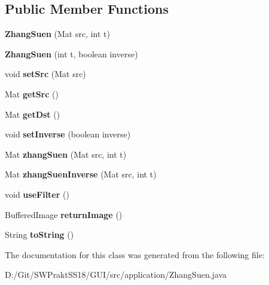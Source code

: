 \subsection*{Public Member Functions}
\begin{DoxyCompactItemize}
\item 
\mbox{\label{classapplication_1_1_zhang_suen_a823dab160c1cbd6fd75439a3651ef2fb}} 
{\bfseries Zhang\+Suen} (Mat src, int t)
\item 
\mbox{\label{classapplication_1_1_zhang_suen_ad13b655dca2f3828609cff40ea77affe}} 
{\bfseries Zhang\+Suen} (int t, boolean inverse)
\item 
\mbox{\label{classapplication_1_1_zhang_suen_a1de41171bc041ea1bc2318f49ba0d116}} 
void {\bfseries set\+Src} (Mat src)
\item 
\mbox{\label{classapplication_1_1_zhang_suen_acfc561cfe4e19101ef72c3b0b3846be6}} 
Mat {\bfseries get\+Src} ()
\item 
\mbox{\label{classapplication_1_1_zhang_suen_a155b9fe37b5cf36fd3857b673b52bd72}} 
Mat {\bfseries get\+Dst} ()
\item 
\mbox{\label{classapplication_1_1_zhang_suen_a8ac61cb706a24be5f56cbc28f7001188}} 
void {\bfseries set\+Inverse} (boolean inverse)
\item 
\mbox{\label{classapplication_1_1_zhang_suen_a9155d617edb00ba059fbffd3499128fe}} 
Mat {\bfseries zhang\+Suen} (Mat src, int t)
\item 
\mbox{\label{classapplication_1_1_zhang_suen_abf8a732e4672ed4f7bbcba7c179fe4c4}} 
Mat {\bfseries zhang\+Suen\+Inverse} (Mat src, int t)
\item 
\mbox{\label{classapplication_1_1_zhang_suen_aec54852dcb044012ced36d0cf6ff546e}} 
void {\bfseries use\+Filter} ()
\item 
\mbox{\label{classapplication_1_1_zhang_suen_ab0f23640f719c5774d7b8a7cfc095996}} 
Buffered\+Image {\bfseries return\+Image} ()
\item 
\mbox{\label{classapplication_1_1_zhang_suen_a19d98661aabaaab6474d4841d4a5c161}} 
String {\bfseries to\+String} ()
\end{DoxyCompactItemize}


The documentation for this class was generated from the following file\+:\begin{DoxyCompactItemize}
\item 
D\+:/\+Git/\+S\+W\+Prakt\+S\+S18/\+G\+U\+I/src/application/Zhang\+Suen.\+java\end{DoxyCompactItemize}
